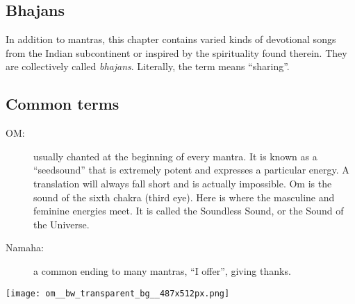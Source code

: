   \subsection*{Bhajans}
  In addition to mantras, this chapter contains varied kinds of devotional songs from the Indian
  subcontinent or inspired by the spirituality found therein. They are collectively called
  \emph{bhajans}. Literally, the term means ``sharing''.

  \subsection*{Common terms}
  \begin{description}
   \item[OM:] usually chanted at the beginning of every mantra. It is known as a ``seedsound'' that
     is extremely potent and expresses a particular energy. A translation will always fall short
     and is actually impossible. Om is the sound of the sixth chakra (third eye). Here is where
     the masculine and feminine energies meet. It is called the Soundless Sound, or the Sound of
     the Universe.
   \item[Namaha:] a common ending to many mantras, ``I offer'', giving thanks.
  \end{description}

  \begin{center}%
    \vspace*{\fill}%
    \texttt{[image: om\_\_bw\_transparent\_bg\_\_487x512px.png]}%
    \vspace*{\fill}%
  \end{center}%
